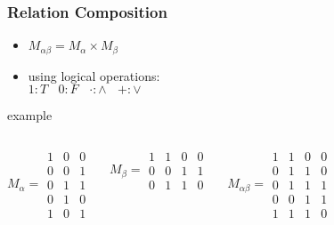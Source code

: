 \documentclass[dvipsnames]{beamer}
\begin{document}
\begin{frame}
  \frametitle{Relation Composition}

  \begin{itemize}
    \item $M_{\alpha \beta} = M_{\alpha} \times M_{\beta}$
    \item using logical operations:\\
      $1:T~~~~0:F~~~~\cdot:\wedge~~~~+:\vee$
  \end{itemize}

  \pause
  \begin{exampleblock}{example}
    \begin{columns}
      \[
        M_\alpha =
          \begin{array}{|ccc|}
            1 & 0 & 0\\
            0 & 0 & 1\\
            0 & 1 & 1\\
            0 & 1 & 0\\
            1 & 0 & 1
         \end{array}
      \]

      \[
        M_\beta =
          \begin{array}{|cccc|}
            1 & 1 & 0 & 0\\
            0 & 0 & 1 & 1\\
            0 & 1 & 1 & 0
          \end{array}
      \]

      \[
        M_{\alpha \beta} =
          \begin{array}{|cccc|}
            1 & 1 & 0 & 0\\
            0 & 1 & 1 & 0\\
            0 & 1 & 1 & 1\\
            0 & 0 & 1 & 1\\
            1 & 1 & 1 & 0
          \end{array}
      \]
    \end{columns}
  \end{exampleblock}
\end{frame}
\end{document}
